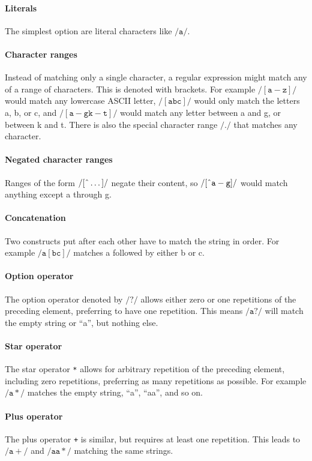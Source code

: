 \documentclass[11pt,a4paper,twoside,openright]{Thesis}
\theoremstyle{definition}
\newcommand{\regex}[1]{\ensuremath{\mathtt{/#1/}}}
\newcommand{\str}[1]{``#1''}
\begin{document}
\paragraph{Literals} The simplest option are literal characters like
\regex{a}.

\paragraph{Character ranges} Instead of matching only a single character, a
regular expression might match any of a range of characters. This is denoted
with brackets. For example \regex{[a-z]} would match any lowercase ASCII
letter, \regex{[abc]} would only match the letters a, b, or c, and
\regex{[a-gk-t]} would match any letter between a and g, or between k and t.
There is also the special character range \regex{.} that matches any character.

\paragraph{Negated character ranges} Ranges of the form \regex{[\string^\dots]}
negate their content, so \regex{[\string^a-g]} would match anything except a through g.

\paragraph{Concatenation} Two constructs put after each other have to match
the string in order. For example \regex{a[bc]} matches a followed by either
b or c.

\paragraph{Option operator} The option operator denoted by \regex{?} allows
either zero or one repetitions of the preceding element, preferring to have
one repetition. This means \regex{a?} will match the empty string or \str{a},
but nothing else.

\paragraph{Star operator} The star operator \texttt{*} allows for arbitrary
repetition of the preceding element, including zero repetitions, preferring as
many repetitions as possible. For example \regex{a*} matches the empty string,
\str{a}, \str{aa}, and so on.

\paragraph{Plus operator} The plus operator \texttt{+} is similar, but
requires at least one repetition. This leads to \regex{a+} and \regex{aa*} matching the
same strings.
\end{document}
